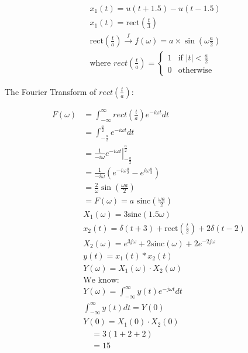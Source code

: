 \documentclass[journal,12pt,onecolumn]{IEEEtran}
\newcommand{\system}[1]{\stackrel{#1}{\rightarrow}}
\theoremstyle{remark}
\begin{document}
\begin{align}
& x_1(t) = u(t+1.5) - u(t-1.5) \\
& x_1(t) = \text{rect}\left(\frac{t}{3}\right)\\ 
& \text{rect}\left(\frac{t}{a}\right) \system{f} f(\omega) = a \times \sin(\omega \frac{a}{2}) \\
& \text{where } rect\left(\frac{t}{a}\right) = \begin{cases}
1 & \text{if } |t| < \frac{a}{2} \\
0 & \text{otherwise}
\end{cases}
\end{align}

The Fourier Transform of $rect\left(\frac{t}{a}\right)$:

\begin{align}
F(\omega) &= \int_{-\infty}^{\infty} rect\left(\frac{t}{a}\right) e^{-i\omega t} dt \\
&= \int_{-\frac{a}{2}}^{\frac{a}{2}} e^{-i\omega t} dt \\
&= \left. \frac{1}{-i\omega} e^{-i\omega t} \right|_{-\frac{a}{2}}^{\frac{a}{2}} \\
&= \frac{1}{-i\omega} (e^{-i\omega \frac{a}{2}} - e^{i\omega \frac{a}{2}}) \\
&= \frac{2}{\omega} \sin\left(\frac{\omega a}{2}\right)\\
&=\boxed{F(\omega) = a \text{ sinc}\left(\frac{\omega a}{2}\right)}\\
& X_1(\omega)=3\text{sinc}(1.5\omega) & \\
& x_2(t) = \delta(t+3) + \text{rect}\left(\frac{t}{2}\right) + 2\delta(t-2) & \\
& X_2(\omega) = e^{3j\omega} + 2\text{sinc}(\omega) + 2e^{-2j\omega} & \\
& y(t) = x_1(t) * x_2(t) & \\
& Y(\omega) = X_1(\omega) \cdot X_2(\omega) & \\
& \text{We know:} & \\
& Y(\omega) = \int_{-\infty}^{\infty} y(t)e^{-j\omega t} dt & \\
& \int_{-\infty}^{\infty} y(t) dt = Y(0) & \\
& Y(0) = X_1(0) \cdot X_2(0) & \\
& \quad = 3(1+2+2) & \\
& \quad = 15 &
\end{align}
\end{document}
